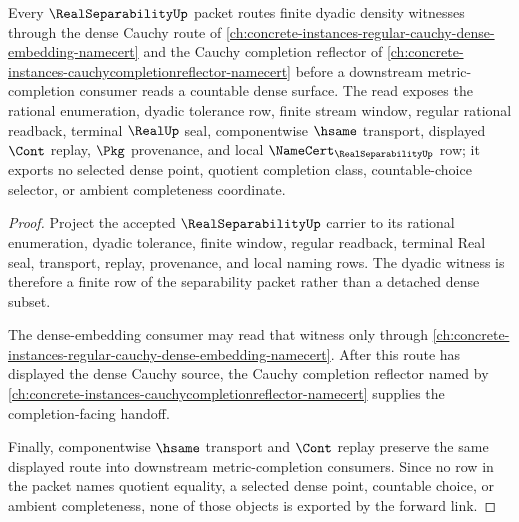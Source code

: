 \begin{theorem}
\label{thm:real-separability-cauchy-dense-forward-link}
Every $\RealSeparabilityUp$ packet routes finite dyadic density witnesses through the dense Cauchy route of \autoref{ch:concrete-instances-regular-cauchy-dense-embedding-namecert} and the Cauchy completion reflector of \autoref{ch:concrete-instances-cauchycompletionreflector-namecert} before a downstream metric-completion consumer reads a countable dense surface. The read exposes the rational enumeration, dyadic tolerance row, finite stream window, regular rational readback, terminal $\RealUp$ seal, componentwise $\hsame$ transport, displayed $\Cont$ replay, $\Pkg$ provenance, and local $\NameCert_{\RealSeparabilityUp}$ row; it exports no selected dense point, quotient completion class, countable-choice selector, or ambient completeness coordinate.
\end{theorem}
\begin{proof}
Project the accepted $\RealSeparabilityUp$ carrier to its rational enumeration, dyadic tolerance, finite window, regular readback, terminal Real seal, transport, replay, provenance, and local naming rows. The dyadic witness is therefore a finite row of the separability packet rather than a detached dense subset.

The dense-embedding consumer may read that witness only through \autoref{ch:concrete-instances-regular-cauchy-dense-embedding-namecert}. After this route has displayed the dense Cauchy source, the Cauchy completion reflector named by \autoref{ch:concrete-instances-cauchycompletionreflector-namecert} supplies the completion-facing handoff.

Finally, componentwise $\hsame$ transport and $\Cont$ replay preserve the same displayed route into downstream metric-completion consumers. Since no row in the packet names quotient equality, a selected dense point, countable choice, or ambient completeness, none of those objects is exported by the forward link.
\end{proof}
